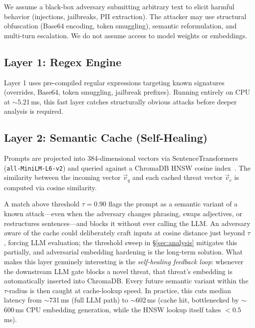 \documentclass[conference]{IEEEtran}
\begin{document}
We assume a black-box adversary submitting arbitrary text to elicit
harmful behavior (injections, jailbreaks, PII extraction). The
attacker may use structural obfuscation (Base64 encoding, token
smuggling), semantic reformulation, and multi-turn escalation. We
do not assume access to model weights or embeddings.



\subsection{Layer 1: Regex Engine}

Layer 1 uses pre-compiled regular expressions targeting known
signatures (overrides, Base64, token smuggling, jailbreak prefixes).
Running entirely on CPU at $\sim$5.21\,ms, this fast layer catches
structurally obvious attacks before deeper analysis is required.



\subsection{Layer 2: Semantic Cache (Self-Healing)}

Prompts are projected into 384-dimensional vectors via
SentenceTransformers~\cite{reimers2019sbert} (\texttt{all-MiniLM-L6-v2})
and queried against a ChromaDB HNSW cosine index~\cite{malkov2020hnsw}.
The similarity between the incoming vector $\vec{v}_q$ and each cached
threat vector $\vec{v}_c$ is computed via cosine similarity.

A match above threshold $\tau{=}0.90$ flags the prompt as a semantic
variant of a known attack---even when the adversary changes phrasing,
swaps adjectives, or restructures sentences---and blocks it without
ever calling the LLM. An adversary aware of the cache could
deliberately craft inputs at cosine distance just beyond $\tau$,
forcing LLM evaluation; the threshold sweep in \S\ref{sec:analysis}
mitigates this partially, and adversarial embedding hardening is the long-term solution. What makes this layer genuinely
interesting is the \textit{self-healing feedback loop}: whenever
the downstream LLM gate blocks a novel threat, that threat's
embedding is automatically inserted into ChromaDB. Every future
semantic variant within the $\tau$-radius is then caught at
cache-lookup speed. In practice, this cuts median latency from
$\sim$731\,ms (full LLM path) to $\sim$602\,ms (cache hit,
bottlenecked by $\sim$600\,ms CPU embedding generation, while the
HNSW lookup itself takes ${<}0.5$\,ms).
\end{document}
